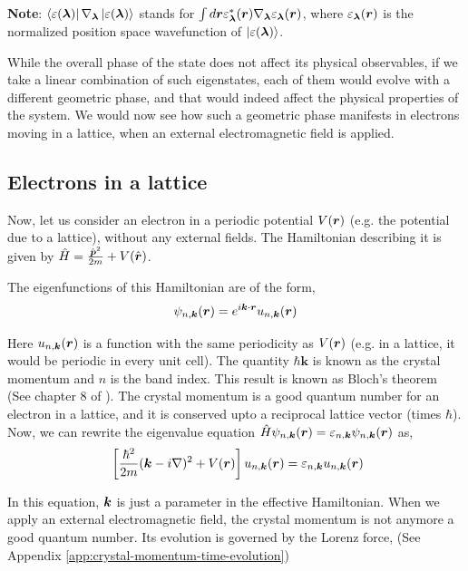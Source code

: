 \documentclass[aps,amsmath,prl]{revtex4-2}
\newcommand{\bvec}[1]{{\mathbf #1}}
\renewcommand\vec[1]{\ensuremath\boldsymbol{#1}} %
\begin{document}
\textbf{Note}: $\bra{\varepsilon({\vec{\lambda}})}\nabla_{\vec{\lambda}} \ket{\varepsilon({\vec{\lambda}})}$ stands for $\int d\vec{r} \varepsilon_{\vec{\lambda}}^* (\vec{r}) \nabla_{\vec{\lambda}} \varepsilon_{\vec{\lambda}}(\vec{r})$, where $\varepsilon_{\vec{\lambda}}(\vec{r})$ is the normalized position space wavefunction of $\ket{\varepsilon({\vec{\lambda}})}$.

While the overall phase of the state does not affect its physical observables, if we take a linear combination of such eigenstates, each of them would evolve with a different geometric phase, and that would indeed affect the physical properties of the system. We would now see how such a geometric phase manifests in electrons moving in a lattice, when an external electromagnetic field is applied.

\subsection{Electrons in a lattice}
Now, let us consider an electron in a periodic potential $V(\vec{r})$ (e.g. the potential due to a lattice), without any external fields. The Hamiltonian describing it is given by $\hat{H} = \frac{{\hat{\vec{p}}}^2}{2 m} + V(\hat{\vec{r}})$.

The eigenfunctions of this Hamiltonian are of the form,
$$\psi_{n, \vec{k}} (\vec{r}) = e^{i \vec{k}\cdot \vec{r}} u_{n,\vec{k}} (\vec{r})$$

Here $u_{n,\vec{k}} (\vec{r})$ is a function with the same periodicity as $V(\vec{r})$ (e.g. in a lattice, it would be periodic in every unit cell). The quantity $\hbar \bvec{k}$ is known as the crystal momentum and $n$ is the band index. This result is known as Bloch's theorem (See chapter 8 of \cite{AshcroftMermin76}). The crystal momentum is a good quantum number for an electron in a lattice, and it is conserved upto a reciprocal lattice vector (times $\hbar$).
Now, we can rewrite the eigenvalue equation $\hat{H} \psi_{n, \vec{k}}(\vec{r}) = \varepsilon_{n,\vec{k}} \psi_{n, \vec{k}}(\vec{r})$ as,
\begin{equation}~\label{Eq:effectiveBlochEquation}
	\left[\frac{\hbar^2}{2m}(\vec{k} - i \nabla)^2 + V(\vec{r}) \right]u_{n,\vec{k}} (\vec{r}) = \varepsilon_{n,\vec{k}} u_{n,\vec{k}} (\vec{r})
\end{equation}

In this equation, $\vec{k}$ is just a parameter in the effective Hamiltonian. When we apply an external electromagnetic field, the crystal momentum is not anymore a good quantum number. Its evolution is governed by the Lorenz force, (See Appendix \ref{app:crystal-momentum-time-evolution})
\end{document}
